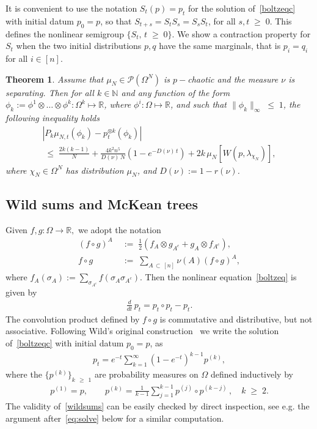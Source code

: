 \documentclass[10pt,a4paper]{article}
\newtheorem{theo}[theorem]{Theorem}
\renewcommand{\leq}{\;\leqslant\;}
\renewcommand{\geq}{\;\geqslant\;}
\newcommand{\Om}{\Omega}
\newcommand{\si}{\sigma}
\newcommand{\cP}{\mathcal{P}}
\newcommand{\bbN}{\mathbb{N}}
\newcommand{\bbR}{\mathbb{R}}
\let\O=\Omega
\begin{document}
It is convenient to use the notation $S_t(p)=p_t$ for the solution of~\eqref{boltzeqc} with initial datum $p_0=p$, so that $S_{t+s}=S_tS_s=S_sS_t$, for all $s,t\geq 0$. This defines the nonlinear semigroup $\{S_t, \,t\geq 0\}$. We show a contraction property for $S_t$ when the two initial distributions $p,q$ have the same marginals, that is $p_i=q_i$ for all $i \in [n]$.

\begin{theo}\label{unifpropchaos}
Assume that $\mu_{N}\in\cP(\O^N)$ is $p-$chaotic and the measure $\nu$ is separating. Then for all $k \in \bbN$ and any function of the form $\phi_k:= \phi^1\otimes\dots\otimes\phi^k:\O^k\mapsto\bbR$, where $ \phi^i:\Om\mapsto \bbR$, and such that $\|\phi_k\|_{\infty}\leq 1$, the following inequality holds
\begin{multline}\label{propchaosuniftime}
\left|P_k\mu_{N,t}(\phi_k)-p_t^{\otimes k}(\phi_k)\right|\\
\leq \frac{2k(k-1)}{N} + \frac{4k^2n^5}{D(\nu)\,N} \left(1-e^{-D(\nu)\, t}\right) + 2 k\,
\mu_N\left[W\left(p,\lambda_{\chi_N}\right)\right],
\end{multline}
where $\chi_N\in\O^N$ has distribution $\mu_{N}$, and $D(\nu):=1-r(\nu)$.
\end{theo}

\subsection{Wild sums and McKean trees}

Given $f, g : \Om \rightarrow \bbR,$ we adopt the notation
\begin{align}
(f \circ g)^{A}\; &{:=}\; \frac{1}{2}\left(f_A \otimes g_{A^c}+ g_A \otimes f_{A^c} \right),\label{defconv1}\\
f \circ g \;&{:=}\; \sum_{A\,\subset\,[n]}\nu(A)(f \circ g)^{A},\label{defconv2}
\end{align}
where $f_A(\si_{A}) := \sum_{\si_{A^c}}f(\si_A\si_{A^c})$. Then the nonlinear equation~\eqref{boltzeq} is given by
\begin{align}\label{boltzeqc}
\frac{d}{dt}\,p_t = p_t\circ p_t - p_t.
\end{align}
The convolution product defined by $f\circ g$ is commutative and distributive, but not associative. Following Wild's original construction~\cite{Wild} we write the solution of~\eqref{boltzeqc} with initial datum $p_0=p$, as
\begin{align}\label{wildsums}
p_t = e^{-t}\sum_{k=1}^{\infty}\left(1-e^{-t}\right)^{k-1}p^{(k)},
\end{align}
where the $\{p^{(k)}\}_{k\,\geq\,1}$ are probability measures on $\Om$ defined inductively by
\begin{align}\label{eq:wildp}
p^{(1)}=p, \qquad p^{(k)} = \frac{1}{k-1}\sum_{j=1}^{k-1}p^{(j)}\circ p^{(k-j)}\,,\quad k\geq 2.
\end{align}
The validity of~\eqref{wildsums} can be easily checked by direct inspection, see e.g. the argument after~\eqref{eq:solve} below for a similar computation.
\end{document}
